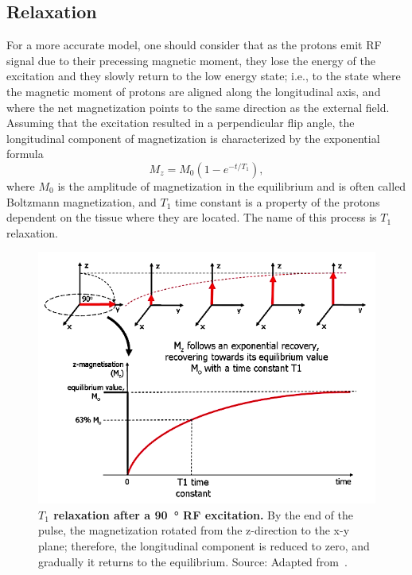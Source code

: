 \subsection{Relaxation}
For a more accurate model, one should consider that as the protons emit RF signal due to their precessing magnetic moment, they lose the energy of the excitation and they slowly return to the low energy state; i.e., to the state where the magnetic moment of protons are aligned along the longitudinal axis, and where the net magnetization points to the same direction as the external field. Assuming that the excitation resulted in a perpendicular flip angle, the longitudinal component of magnetization is characterized by the exponential formula
\[M_z = M_0 (1 - e^{-t/T_1}),\]
where $M_0$ is the amplitude of magnetization in the equilibrium and is often called Boltzmann magnetization, and $T_1$ time constant is a property of the protons dependent on the tissue where they are located. The name of this process is $T_1$ relaxation.

\begin{figure}[thb]
    \centering
    \includegraphics[width=0.8\linewidth]{images/T1_relaxation.png}
    \caption{\textbf{$T_1$ relaxation after a \SI{90}{\degree} RF excitation.} By the end of the pulse, the magnetization rotated from the z-direction to the x-y plane; therefore, the longitudinal component is reduced to zero, and gradually it returns to the equilibrium. Source: Adapted from~\cite{ridgway_cardiovascular_2010}.}
    \label{fig:T1_relaxation}
\end{figure}

